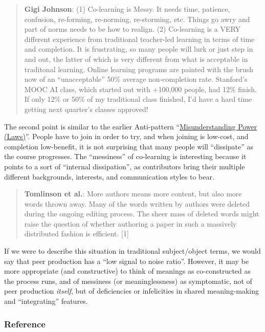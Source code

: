\begin{quote}
\textbf{Gigi Johnson}: (1) Co-learning is Messy. It needs time,
patience, confusion, re-forming, re-norming, re-storming, etc. Things go
awry and part of norms needs to be how to realign. (2) Co-learning is a
VERY different experience from traditional teacher-led learning in terms
of time and completion. It is frustrating, so many people will lurk or
just step in and out, the latter of which is very different from what is
acceptable in traditonal learning. Online learning programs are painted
with the brush now of an ``unacceptable'' 50\% average non-completion
rate. Stanford's MOOC AI class, which started out with +100,000 people,
had 12\% finish. If only 12\% or 50\% of my traditional class finished,
I'd have a hard time getting next quarter's classes approved!
\end{quote}
The second point is similar to the earlier Anti-pattern
``\href{http://socialmediaclassroom.com/host/peeragogy/forum/anti-patterns-concerns-complaints-and-critiques\#comment-1854}{Misunderstanding
Power (Laws)}''. People have to join in order to try, and when joining
is low-cost, and completion low-benefit, it is not surprising that many
people will ``dissipate'' as the course progresses. The ``messiness'' of
co-learning is interesting because it points to a sort of ``internal
dissipation'', as contributors bring their multiple different
backgrounds, interests, and communication styles to bear.

\begin{quote}
\textbf{Tomlinson et al.}: More authors means more content, but also
more words thrown away. Many of the words written by authors were
deleted during the ongoing editing process. The sheer mass of deleted
words might raise the question of whether authoring a paper in such a
massively distributed fashion is efficient. {[}1{]}
\end{quote}
If we were to describe this situation in traditional subject/object
terms, we would say that peer production has a ``low signal to noise
ratio''. However, it may be more appropriate (and constructive) to think
of meanings as co-constructed as the process runs, and of messiness (or
meaninglessness) as symptomatic, not of peer production \emph{itself},
but of deficiencies or infelicities in shared meaning-making and
``integrating'' features.

\subsubsection{Reference}

